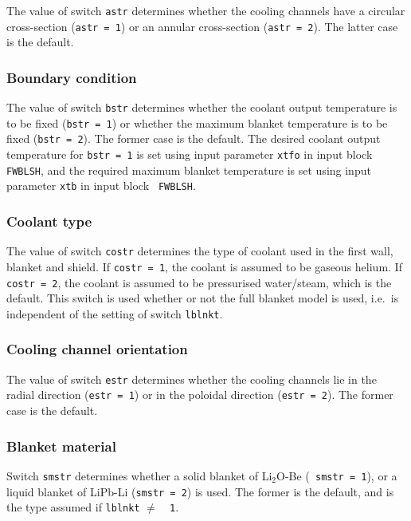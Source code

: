 \documentclass[11pt,a4paper]{report}
\begin{document}
The value of switch {\tt astr} determines whether the cooling channels have a
circular cross-section ({\tt astr = 1}) or an annular cross-section ({\tt astr
= 2}). The latter case is the default.

\subsubsection{Boundary condition}

The value of switch {\tt bstr} determines whether the coolant output
temperature is to be fixed ({\tt bstr = 1}) or whether the maximum blanket
temperature is to be fixed ({\tt bstr~=~2}). The former case is the default.
The desired coolant output temperature for {\tt bstr = 1} is set using input
parameter {\tt xtfo} in input block {\tt FWBLSH}, and the required maximum
blanket temperature is set using input parameter {\tt xtb} in input block {\tt
FWBLSH}.

\subsubsection{Coolant type}
\label{sec:costr}

The value of switch {\tt costr} determines the type of coolant used in the
first wall, blanket and shield. If {\tt costr = 1}, the coolant is assumed to
be gaseous helium. If {\tt costr = 2}, the coolant is assumed to be
pressurised water/steam, which is the default. This switch is used whether or
not the full blanket model is used, i.e.\ is independent of the setting of
switch {\tt lblnkt}.

\subsubsection{Cooling channel orientation}

The value of switch {\tt estr} determines whether the cooling channels lie in
the radial direction ({\tt estr = 1}) or in the poloidal direction ({\tt estr
= 2}). The former case is the default.

\subsubsection{Blanket material}

Switch {\tt smstr} determines whether a solid blanket of Li$_2$O-Be ({\tt
smstr = 1}), or a liquid blanket of LiPb-Li ({\tt smstr = 2}) is used. The
former is the default, and is the type assumed if {\tt lblnkt} $\not=$~{\tt
1}.
\end{document}
